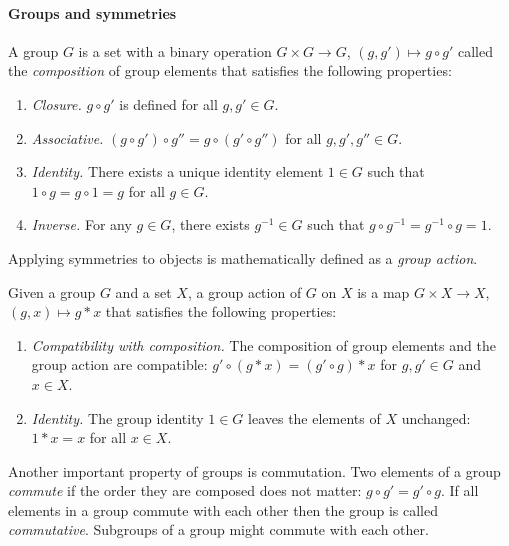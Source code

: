 \paragraph{Groups and symmetries}
\begin{definition}[Group]
    A group $G$ is a set with a binary operation $G \times G \to G$, $(g, g') \mapsto g \circ g'$ called the \textit{composition} of group elements that satisfies the following properties:
\begin{enumerate}
    \item \textit{Closure.}
    $g \circ g'$ is defined for all $g, g' \in G$.
    \item \textit{Associative.}
    $(g \circ g') \circ g'' = g \circ (g' \circ g'')$ for all $g, g', g'' \in G$.
    \item \textit{Identity.}
    There exists a unique identity element $1 \in G$ such that $1 \circ g = g \circ 1 = g$ for all $g \in G$.
    \item \textit{Inverse.}
    For any $g \in G$, there exists $g^{-1} \in G$ such that $g \circ g^{-1} = g^{-1} \circ g = 1$.
\end{enumerate}
\end{definition}

Applying symmetries to objects is mathematically defined as a \textit{group action}.

\begin{definition}
    Given a group $G$ and a set $X$, a group action of $G$ on $X$ is a map $G \times X \to X$, $(g,x) \mapsto g * x$ that satisfies the following properties:
\begin{enumerate}
    \item \textit{Compatibility with composition.}
    The composition of group elements and the group action are compatible: $g' \circ (g * x) = (g' \circ g) * x$ for $g,g' \in G$ and $x \in X$.
    \item \textit{Identity.}
    The group identity $1 \in G$ leaves the elements of $X$ unchanged: $1 * x = x$ for all $x \in X$.
\end{enumerate}
\end{definition}



Another important property of groups is commutation.
Two elements of a group \textit{commute} if the order they are composed does not matter: $g \circ g' = g' \circ g$.
If all elements in a group commute with each other then the group is called \textit{commutative}.
Subgroups of a group might commute with each other.

